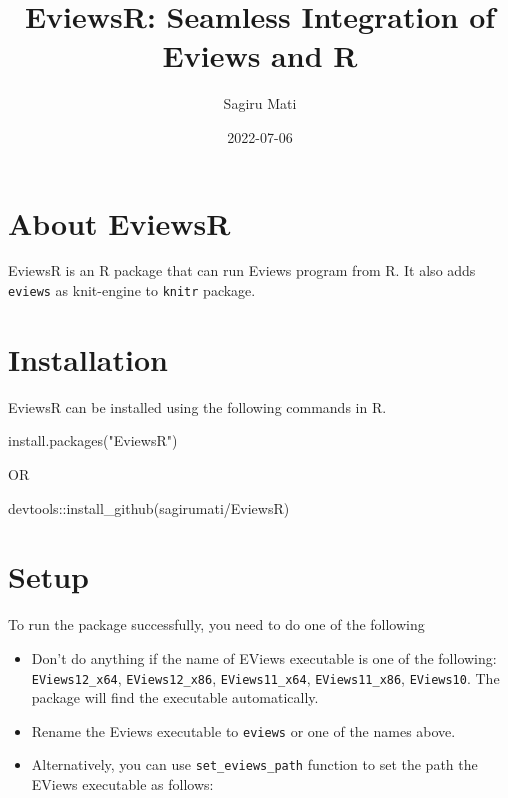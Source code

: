 \documentclass[
]{article}
\title{EviewsR: Seamless Integration of Eviews and R}
\author{Sagiru Mati}
\date{2022-07-06}
\newenvironment{Shaded}{\begin{snugshade}}{\end{snugshade}}
\newcommand{\FunctionTok}[1]{\textcolor[rgb]{0.00,0.00,0.00}{#1}}
\newcommand{\NormalTok}[1]{#1}
\newcommand{\SpecialCharTok}[1]{\textcolor[rgb]{0.00,0.00,0.00}{#1}}
\newcommand{\StringTok}[1]{\textcolor[rgb]{0.31,0.60,0.02}{#1}}
\begin{document}
\maketitle

{
\setcounter{tocdepth}{2}
\tableofcontents
}
\hypertarget{about-eviewsr}{%
\section{About EviewsR}\label{about-eviewsr}}

EviewsR is an R package that can run Eviews program from R. It also adds \texttt{eviews} as knit-engine to \texttt{knitr} package.

\hypertarget{installation}{%
\section{Installation}\label{installation}}

EviewsR can be installed using the following commands in R.

\begin{Shaded}
\begin{Highlighting}[]
\FunctionTok{install.packages}\NormalTok{(}\StringTok{"EviewsR"}\NormalTok{) }

\NormalTok{            OR}
            
\NormalTok{devtools}\SpecialCharTok{::}\FunctionTok{install\_github}\NormalTok{(}\StringTok{\textquotesingle{}sagirumati/EviewsR\textquotesingle{}}\NormalTok{)}
\end{Highlighting}
\end{Shaded}

\hypertarget{setup}{%
\section{Setup}\label{setup}}

To run the package successfully, you need to do one of the following

\begin{itemize}
\item
  Don't do anything if the name of EViews executable is one of the following: \texttt{EViews12\_x64}, \texttt{EViews12\_x86}, \texttt{EViews11\_x64}, \texttt{EViews11\_x86}, \texttt{EViews10}. The package will find the executable automatically.
\item
  Rename the Eviews executable to \texttt{eviews} or one of the names above.
\item
  Alternatively, you can use \texttt{set\_eviews\_path} function to set the path the EViews executable as follows:
\end{itemize}
\end{document}
